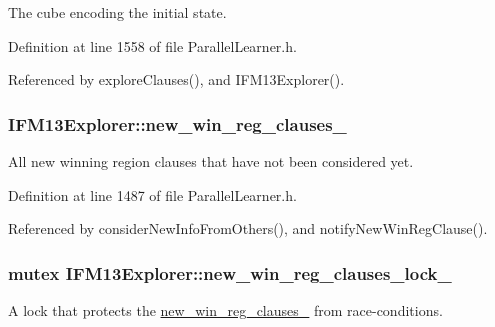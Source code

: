 The cube encoding the initial state. 



Definition at line 1558 of file Parallel\-Learner.\-h.



Referenced by explore\-Clauses(), and I\-F\-M13\-Explorer().

\hypertarget{classIFM13Explorer_a712b3dc6c099b1e3697e7b8877e0cd90}{
\subsubsection[{new\-\_\-win\-\_\-reg\-\_\-clauses\-\_\-}]{ I\-F\-M13\-Explorer\-::new\-\_\-win\-\_\-reg\-\_\-clauses\-\_\-\hspace{0.3cm}{\ttfamily [protected]}}}\label{classIFM13Explorer_a712b3dc6c099b1e3697e7b8877e0cd90}


All new winning region clauses that have not been considered yet. 



Definition at line 1487 of file Parallel\-Learner.\-h.



Referenced by consider\-New\-Info\-From\-Others(), and notify\-New\-Win\-Reg\-Clause().

\hypertarget{classIFM13Explorer_a2e2722cb76399e087f62445b959ff5ed}{
\subsubsection[{new\-\_\-win\-\_\-reg\-\_\-clauses\-\_\-lock\-\_\-}]{\setlength{\rightskip}{0pt plus 5cm}mutex I\-F\-M13\-Explorer\-::new\-\_\-win\-\_\-reg\-\_\-clauses\-\_\-lock\-\_\-\hspace{0.3cm}{\ttfamily [protected]}}}\label{classIFM13Explorer_a2e2722cb76399e087f62445b959ff5ed}


A lock that protects the \hyperlink{classIFM13Explorer_a712b3dc6c099b1e3697e7b8877e0cd90}{new\-\_\-win\-\_\-reg\-\_\-clauses\-\_\-} from race-\/conditions. 

